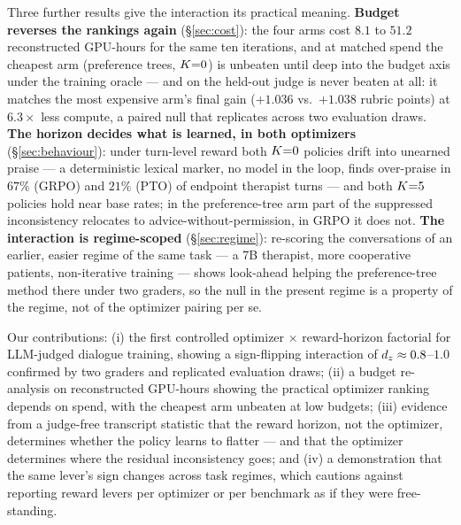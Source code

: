 Three further results give the interaction its practical meaning. \textbf{Budget reverses the
rankings again} (\S\ref{sec:cost}): the four arms cost $8.1$ to $51.2$ reconstructed GPU-hours
for the same ten iterations, and at matched spend the cheapest arm (preference trees, $K{=}0$) is
unbeaten until deep into the budget axis under the training oracle --- and on the held-out judge
is never beaten at all: it matches the most expensive arm's final gain ($+1.036$ vs.\ $+1.038$
rubric points) at $6.3\times$ less compute, a paired null that replicates across two evaluation
draws. \textbf{The horizon decides what is
learned, in both optimizers} (\S\ref{sec:behaviour}): under turn-level reward both $K{=}0$ policies
drift into unearned praise --- a deterministic lexical marker, no model in the loop, finds
over-praise in $67\%$ (GRPO) and $21\%$ (PTO) of endpoint therapist turns --- and both $K{=}5$
policies hold near base rates; in the preference-tree arm part of the suppressed inconsistency
relocates to advice-without-permission, in GRPO it does not. \textbf{The interaction is
regime-scoped} (\S\ref{sec:regime}): re-scoring the conversations of an earlier, easier regime of
the same task --- a 7B therapist, more cooperative patients, non-iterative training --- shows
look-ahead helping the preference-tree method there under two graders, so the null in the present
regime is a property of the regime, not of the optimizer pairing per se.

Our contributions: (i) the first controlled optimizer $\times$ reward-horizon factorial for
LLM-judged dialogue training, showing a sign-flipping interaction of $d_z \approx 0.8$--$1.0$
confirmed by two graders and replicated evaluation draws; (ii) a budget re-analysis on
reconstructed GPU-hours showing the practical optimizer ranking depends on spend, with the
cheapest arm unbeaten at low budgets; (iii) evidence from a judge-free transcript statistic that
the reward horizon, not the optimizer, determines whether the policy learns to flatter --- and
that the optimizer determines where the residual inconsistency goes; and (iv) a demonstration
that the same lever's sign changes across task regimes, which cautions against reporting reward
levers per optimizer or per benchmark as if they were free-standing.
